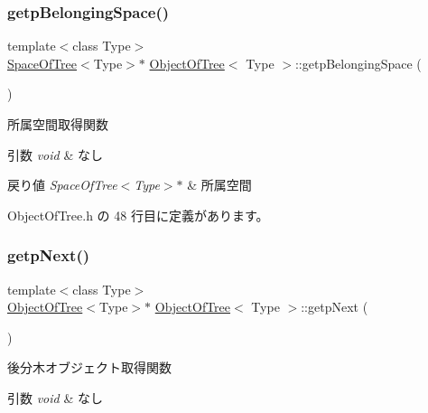 \subsubsection{\texorpdfstring{getp\+Belonging\+Space()}{getpBelongingSpace()}}
{\footnotesize\ttfamily template$<$class Type$>$ \\
\mbox{\hyperlink{class_space_of_tree}{Space\+Of\+Tree}}$<$Type$>$$\ast$ \mbox{\hyperlink{class_object_of_tree}{Object\+Of\+Tree}}$<$ Type $>$\+::getp\+Belonging\+Space (\begin{DoxyParamCaption}{ }\end{DoxyParamCaption})\hspace{0.3cm}{\ttfamily [inline]}}



所属空間取得関数 


\begin{DoxyParams}{引数}
{\em void} & なし \\
\hline
\end{DoxyParams}

\begin{DoxyRetVals}{戻り値}
{\em Space\+Of\+Tree$<$\+Type$>$$\ast$} & 所属空間 \\
\hline
\end{DoxyRetVals}


 Object\+Of\+Tree.\+h の 48 行目に定義があります。

\mbox{\label{class_object_of_tree_a4bf7eb4fdf8928f21ae1a1559f714add}} 
\subsubsection{\texorpdfstring{getp\+Next()}{getpNext()}}
{\footnotesize\ttfamily template$<$class Type$>$ \\
\mbox{\hyperlink{class_object_of_tree}{Object\+Of\+Tree}}$<$Type$>$$\ast$ \mbox{\hyperlink{class_object_of_tree}{Object\+Of\+Tree}}$<$ Type $>$\+::getp\+Next (\begin{DoxyParamCaption}{ }\end{DoxyParamCaption})\hspace{0.3cm}{\ttfamily [inline]}}



後分木オブジェクト取得関数 


\begin{DoxyParams}{引数}
{\em void} & なし \\
\hline
\end{DoxyParams}

